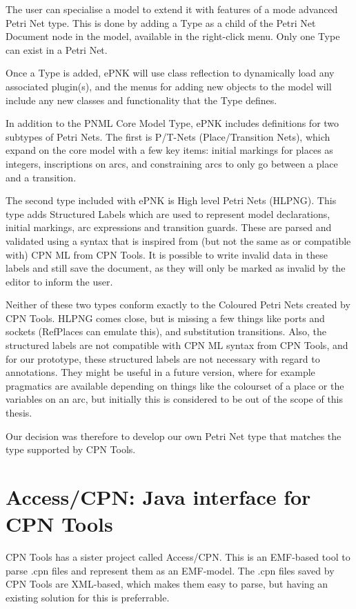 The user can specialise a model to extend it with features of a mode advanced
Petri Net type. This is done by adding a Type as a child of the Petri Net
Document node in the model, available in the right-click menu. Only one
Type can exist in a Petri Net.

Once a Type is added, ePNK will use class reflection to dynamically load
any associated plugin(s), and the menus for adding new objects to the model will
include any new classes and functionality that the Type defines.

In addition to the PNML Core Model Type, ePNK includes definitions for
two subtypes of Petri Nets. The first is P/T-Nets (Place/Transition Nets), which
expand on the core model with a few key items: initial markings for places as
integers, inscriptions on arcs, and constraining arcs to only go between a place
and a transition.

The second type included with ePNK is High level Petri Nets (HLPNG). This type
adds Structured Labels which are used to represent model declarations, initial
markings, arc expressions and transition guards.
These are parsed and validated using a syntax that is inspired from (but not the
same as or compatible with) CPN ML from CPN Tools. It is possible to write
invalid data in these labels and still save the document, as they will only be
marked as invalid by the editor to inform the user.

Neither of these two types conform exactly to the Coloured Petri Nets created by
CPN Tools. HLPNG comes close, but is missing a few things like ports and sockets
(RefPlaces can emulate this), and substitution transitions. Also, the
structured labels are not compatible with CPN ML syntax from CPN Tools, and for
our prototype, these structured labels are not necessary with regard to
annotations. They might be useful in a future version, where for example
pragmatics are available depending on things like the colourset of a place or the
variables on an arc, but initially this is considered to be out of the scope of
this thesis.

Our decision was therefore to develop our own Petri Net type that matches the
type supported by CPN Tools.

\section{Access/CPN: Java interface for CPN Tools}
CPN Tools has a sister project called Access/CPN. This is an
EMF-based tool to parse .cpn files and represent them as an
EMF-model. The .cpn files saved by CPN Tools are XML-based, which makes them
easy to parse, but having an existing solution for this is preferrable.


